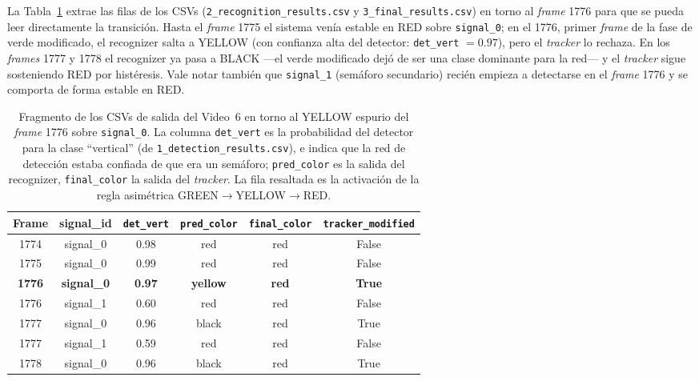 La Tabla~\ref{tab:csv_yellow_espurio} extrae las filas de los CSVs (\texttt{2\_recognition\_results.csv} y \texttt{3\_final\_results.csv}) en torno al \textit{frame} 1776 para que se pueda leer directamente la transición. Hasta el \textit{frame} 1775 el sistema venía estable en RED sobre \texttt{signal\_0}; en el 1776, primer \textit{frame} de la fase de verde modificado, el recognizer salta a YELLOW (con confianza alta del detector: \texttt{det\_vert} $= 0.97$), pero el \textit{tracker} lo rechaza. En los \textit{frames} 1777 y 1778 el recognizer ya pasa a BLACK ---el verde modificado dejó de ser una clase dominante para la red--- y el \textit{tracker} sigue sosteniendo RED por histéresis. Vale notar también que \texttt{signal\_1} (semáforo secundario) recién empieza a detectarse en el \textit{frame} 1776 y se comporta de forma estable en RED.

\begin{table}[H]
\centering
\small
\begin{tabular}{|c|c|c|c|c|c|}
\hline
\textbf{Frame} & \textbf{signal\_id} & \texttt{det\_vert} & \texttt{pred\_color} & \texttt{final\_color} & \texttt{tracker\_modified} \\
\hline
1774 & signal\_0 & 0.98 & red    & red & False \\
1775 & signal\_0 & 0.99 & red    & red & False \\
\hline
\textbf{1776} & \textbf{signal\_0} & \textbf{0.97} & \textbf{yellow} & \textbf{red} & \textbf{True} \\
1776 & signal\_1 & 0.60 & red    & red & False \\
\hline
1777 & signal\_0 & 0.96 & black  & red & True \\
1777 & signal\_1 & 0.59 & red    & red & False \\
1778 & signal\_0 & 0.96 & black  & red & True \\
\hline
\end{tabular}
\caption{Fragmento de los CSVs de salida del Video~6 en torno al YELLOW espurio del \textit{frame} 1776 sobre \texttt{signal\_0}. La columna \texttt{det\_vert} es la probabilidad del detector para la clase ``vertical'' (de \texttt{1\_detection\_results.csv}), e indica que la red de detección estaba confiada de que era un semáforo; \texttt{pred\_color} es la salida del recognizer, \texttt{final\_color} la salida del \textit{tracker}. La fila resaltada es la activación de la regla asimétrica GREEN$\to$YELLOW$\to$RED.}
\label{tab:csv_yellow_espurio}
\end{table}

